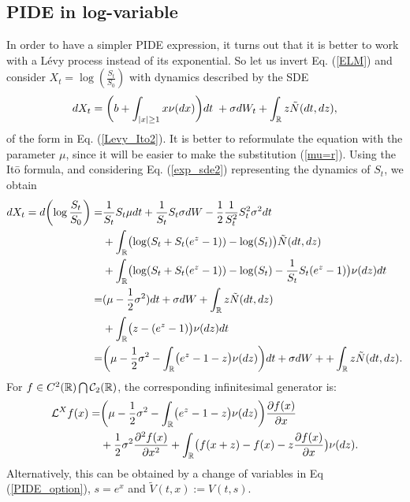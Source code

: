 \subsection{PIDE in log-variable}\label{log_var_section}

In order to have a simpler PIDE expression, it turns out that it is better to work with a Lévy process instead of its exponential. So let us invert Eq. (\ref{ELM})
and consider $ X_t = \log \left( \frac{S_t}{S_0} \right)$ with dynamics described by the SDE 
\begin{equation}\label{SDE_log_var}
 dX_t = \biggl( b + \int_{|x|\geq 1}x \nu(dx) \biggr) dt \; + \sigma dW_t + \int_{\mathbb{R}} z \tilde N(dt,dz),
\end{equation}
of the form in Eq. (\ref{Levy_Ito2}). 
It is better to reformulate the equation with the parameter $\mu$, since it will be easier to make the substitution (\ref{mu=r}). Using the It\=o formula,
and considering Eq. (\ref{exp_sde2}) representing the dynamics of $S_t$, we obtain
\begin{align*}
 dX_t = d\biggl( \log \frac{S_t}{S_0}\biggr) =& \frac{1}{S_t} S_t \mu dt + \frac{1}{S_t} S_t \sigma dW - \frac{1}{2} \frac{1}{S_t^2} S_t^2 \sigma^2 dt \\
 &  + \int_{\mathbb{R}} \bigl( \log(S_t+S_t(e^z-1)) - \log(S_t) \bigr) \tilde N(dt,dz) \\
 &  + \int_{\mathbb{R}} \bigl( \log(S_t+S_t(e^z-1)) - \log(S_t) -\frac{1}{S_t} S_t (e^z-1) \bigr) \nu(dz)dt \\
 =& (\mu-\frac{1}{2}\sigma^2)dt + \sigma dW + \int_{\mathbb{R}} z \tilde N(dt,dz) \\
 &  + \int_{\mathbb{R}} \bigl( z - (e^z-1) \bigr) \nu(dz) dt \\
 =& \biggl( \mu-\frac{1}{2}\sigma^2 - \int_{\mathbb{R}} \bigl( e^z-1-z \bigr) \nu(dz) \biggr)dt + \sigma dW + + \int_{\mathbb{R}} z \tilde N(dt,dz).
\end{align*}
For $f \in C^{2}(\mathbb{R}) \bigcap \mathcal{C}_2(\mathbb{R})$, the corresponding infinitesimal generator is:
\begin{align}\label{RN_log_gen}
 \mathcal{L}^X f(x) =& \biggl( \mu-\frac{1}{2}\sigma^2 - \int_{\mathbb{R}} \bigl( e^z-1-z \bigr) \nu(dz) \biggr) \frac{\partial f(x)}{\partial x} \\ \nonumber
          &+ \frac{1}{2} \sigma^2 \frac{\partial^2 f(x)}{\partial x^2} 
          + \int_{\mathbb{R}} \bigl( f(x+z)- f(x) - z \frac{\partial f(x)}{\partial x} \bigr) \nu(dz).
\end{align}
Alternatively, this can be obtained by a change of variables in Eq (\ref{PIDE_option}), $s = e^x$ and $\tilde V(t,x) := V(t,s)$. 
